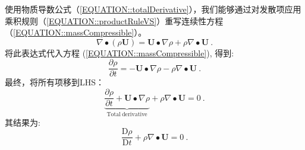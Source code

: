 \documentclass[MathematicsNumericsDerivationsAndOpenFOAM.tex]{subfiles}
\begin{document}
 使用物质导数公式（\ref{EQUATION::totalDerivative}），我们能够通过对发散项应用乘积规则（\ref{EQUATION::productRuleVS}）重写连续性方程（\ref{EQUATION::massCompressible}）。
%
%
\begin{equation}
  \nabla \bullet \left(\rho \textbf{U}\right)
=
  \textbf{U} \bullet \nabla \rho + \rho \nabla \bullet \textbf{U} ~.
\end{equation}
%
%
	将此表达式代入方程
    (\ref{EQUATION::massCompressible}), 得到:
%
%
\begin{equation}
 \frac{\partial \rho}{\partial t}
 =
 -\textbf{U} \bullet \nabla \rho - \rho \nabla \bullet \textbf{U} ~.
\end{equation}
%
%
	最终，将所有项移到LHS：
%
%
\begin{equation}
 \underbrace{\frac{\partial \rho}{\partial t}
+
 \textbf{U} \bullet \nabla \rho}_{\mathrm{Total~derivative}}
+
 \rho \nabla \bullet \textbf{U}
 =
0 ~.
\end{equation}
%
%
其结果为:
%
%
\begin{equation}
 \frac{\mathrm{D} \rho}{\mathrm{D} t}
+
 \rho \nabla \bullet \textbf{U}
 =
0 ~.
\end{equation}
%
%



\end{document}
